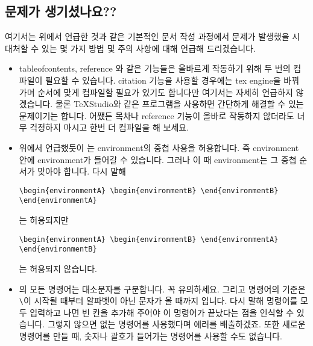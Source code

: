 \subsection{문제가 생기셨나요??}
\label{sec:text-help}
여기서는 위에서 언급한 것과 같은 기본적인 문서 작성 과정에서 문제가 발생했을 시 대처할 수 있는 몇 가지 방법 및 주의 사항에 대해 언급해 드리겠습니다.
\begin{itemize}
\item tableofcontents, reference 와 같은 기능들은 올바르게 작동하기 위해 두 번의 컴파일이 필요할 수 있습니다. citation 기능을 사용할 경우에는 tex engine을 바꿔 가며 순서에 맞게 컴파일할 필요가 있기도 합니다만 여기서는 자세히 언급하지 않겠습니다. 물론 TeXStudio와 같은 프로그램을 사용하면 간단하게 해결할 수 있는 문제이기는 합니다. 어쨌든 목차나 reference 기능이 올바로 작동하지 않더라도 너무 걱정하지 마시고 한번 더 컴파일을 해 보세요.
\item 위에서 언급했듯이 \lt 는 environment의 중첩 사용을 허용합니다. 즉 environment 안에 environment가 들어갈 수 있습니다. 그러나 이 때 environment는 그 중첩 순서가 맞아야 합니다. 다시 말해
\begin{Verbatim}
\begin{environmentA} \begin{environmentB} \end{environmentB} \end{environmentA}
\end{Verbatim}
  는 허용되지만
\begin{Verbatim}
\begin{environmentA} \begin{environmentB} \end{environmentA} \end{environmentB}
\end{Verbatim}
  는 허용되지 않습니다.
\item \lt 의 모든 명령어는 대소문자를 구분합니다. 꼭 유의하세요. 그리고 명령어의 기준은 \verb|\|이 시작될 때부터 알파벳이 아닌 문자가 올 때까지 입니다. 다시 말해 명령어를 모두 입력하고 나면 빈 칸을 추가해 주어야 \lt 이 명령어가 끝났다는 점을 인식할 수 있습니다. 그렇지 않으면 없는 명령어를 사용했다며 에러를 배출하겠죠. 또한 새로운 명령어를 만들 때, 숫자나 괄호가 들어가는 명령어를 사용할 수도 없습니다.

\end{itemize}

